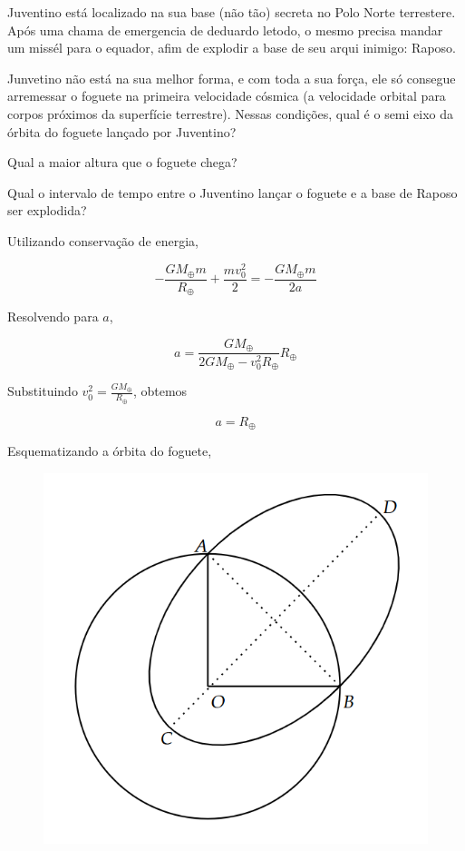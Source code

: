 \documentclass[11pt]{article}
\begin{document}
\begin{pproblem} Juventino está localizado na sua base (não tão) secreta no Polo Norte terrestere. Após uma chama de emergencia de deduardo letodo, o mesmo precisa mandar um missél para o equador, afim de explodir a base de seu arqui inimigo: Raposo. 
    \begin{alternativas}
        \item Junvetino não está na sua melhor forma, e com toda a sua força, ele só consegue arremessar o foguete na primeira velocidade cósmica (a velocidade orbital para corpos próximos da superfície terrestre). Nessas condições, qual é o semi eixo da órbita do foguete lançado por Juventino?
        \item Qual a maior altura que o foguete chega?
        \item Qual o intervalo de tempo entre o Juventino lançar o foguete e a base de Raposo ser explodida?
    \end{alternativas}

    \begin{pssolution*}{}{}
        \begin{alternativas}
            \item Utilizando conservação de energia, 
            
            \[-\frac{GM_\oplus m}{R_\oplus} + \frac{mv_0^2}{2} = -\frac{GM_\oplus m}{2a}\]

            Resolvendo para \(a\), 

            \[a = \frac{GM_\oplus}{2GM_\oplus - v_0^2 R_\oplus}R_\oplus\]

            Substituindo \(v_0^2 = \frac{GM_\oplus}{R_\oplus}\), obtemos 

            \[\boxed{a = R_\oplus}\]

            \item Esquematizando a órbita do foguete, 
            
            \begin{figure}[H]
                \centering
                \includegraphics[width=0.7\linewidth]{imagens/orbitapn-eq.png}                
            \end{figure}


\end{alternativas}
\end{pssolution*}
\end{pproblem}
\end{document}
